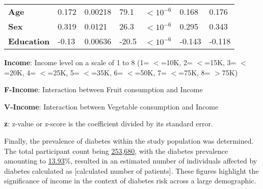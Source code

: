 \documentclass[11pt]{article}
\begin{document}
\begin{table}[h]
\begin{threeparttable}
{\begin{tabular}{lllllll}
\textbf{Age} & \raisebox{2ex}{\hypertarget{B7a}{}}0.172 & \raisebox{2ex}{\hypertarget{B7b}{}}0.00218 & \raisebox{2ex}{\hypertarget{B7c}{}}79.1 & $<$\raisebox{2ex}{\hypertarget{B7d}{}}$10^{-6}$ & \raisebox{2ex}{\hypertarget{B7e}{}}0.168 & \raisebox{2ex}{\hypertarget{B7f}{}}0.176 \\
\textbf{Sex} & \raisebox{2ex}{\hypertarget{B8a}{}}0.319 & \raisebox{2ex}{\hypertarget{B8b}{}}0.0121 & \raisebox{2ex}{\hypertarget{B8c}{}}26.3 & $<$\raisebox{2ex}{\hypertarget{B8d}{}}$10^{-6}$ & \raisebox{2ex}{\hypertarget{B8e}{}}0.295 & \raisebox{2ex}{\hypertarget{B8f}{}}0.343 \\
\textbf{Education} & \raisebox{2ex}{\hypertarget{B9a}{}}-0.13 & \raisebox{2ex}{\hypertarget{B9b}{}}0.00636 & \raisebox{2ex}{\hypertarget{B9c}{}}-20.5 & $<$\raisebox{2ex}{\hypertarget{B9d}{}}$10^{-6}$ & \raisebox{2ex}{\hypertarget{B9e}{}}-0.143 & \raisebox{2ex}{\hypertarget{B9f}{}}-0.118 \\
\bottomrule
\end{tabular}}
\begin{tablenotes}
\footnotesize
\item \textbf{Income}: Income level on a scale of 1 to 8 (1= $<$=10K, 2= $<$=15K, 3= $<$=20K, 4= $<$=25K, 5= $<$=35K, 6= $<$=50K, 7= $<$=75K, 8= $>$75K)
\item \textbf{F-Income}: Interaction between Fruit consumption and Income
\item \textbf{V-Income}: Interaction between Vegetable consumption and Income
\item \textbf{z}: z-value or z-score is the coefficient divided by its standard error.
\end{tablenotes}
\end{threeparttable}
\end{table}


Finally, the prevalence of diabetes within the study population was determined. The total participant count being \hyperlink{R0a}{253,680}, with the diabetes prevalence amounting to \hyperlink{R1a}{13.93}\%, resulted in an estimated number of individuals affected by diabetes calculated as [calculated number of patients]. These figures highlight the significance of income in the context of diabetes risk across a large demographic.
\end{document}
